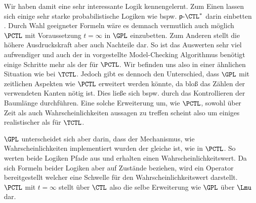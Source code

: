 Wir haben damit eine sehr interessante Logik kennengelernt.
Zum Einen lassen sich einige sehr starke probabilistische Logiken wie bspw. $\mathsf{p}\text{-}\CTL^*$ darin einbetten \cite{cleaveland2005probabilistic}.
Durch Wahl geeigneter Formeln wäre es demnach vermutlich auch möglich $\PCTL$ mit Voraussetzung $t=\infty$ in $\GPL$ einzubetten.
Zum Anderen stellt die höhere Ausdruckskraft aber auch Nachteile dar.
So ist das Auswerten sehr viel aufwendiger und auch der in \cite{cleaveland2005probabilistic} vorgestellte Model-Checking Algorithmus benötigt einige Schritte mehr als der für $\PCTL$.
Wir befinden uns also in einer ähnlichen Situation wie bei $\TCTL$.
Jedoch gibt es dennoch den Unterschied, dass $\GPL$ mit zeitlichen Aspekten wie $\PCTL$ erweitert werden könnte, da bloß das Zählen der verwendeten Kanten nötig ist.
Dies ließe sich bspw. durch das Kontrollieren der Baumlänge durchführen.
Eine solche Erweiterung um, wie $\PCTL$, sowohl über Zeit als auch Wahrscheinlichkeiten aussagen zu treffen scheint also um einiges realistischer als für $\TCTL$.

$\GPL$ unterscheidet sich aber darin, dass der Mechanismus, wie Wahrscheinlichkeiten implementiert wurden der gleiche ist, wie in $\PCTL$.
So werten beide Logiken Pfade aus und erhalten einen Wahrscheinlichkeitswert.
Da sich Formeln beider Logiken aber auf Zustände beziehen, wird ein Operator bereitgestellt welcher eine Schwelle für den Wahrscheinlichkeitswert darstellt.
$\PCTL$ mit $t=\infty$ stellt über $\CTL$ also die selbe Erweiterung wie $\GPL$ über $\Lmu$ dar.













